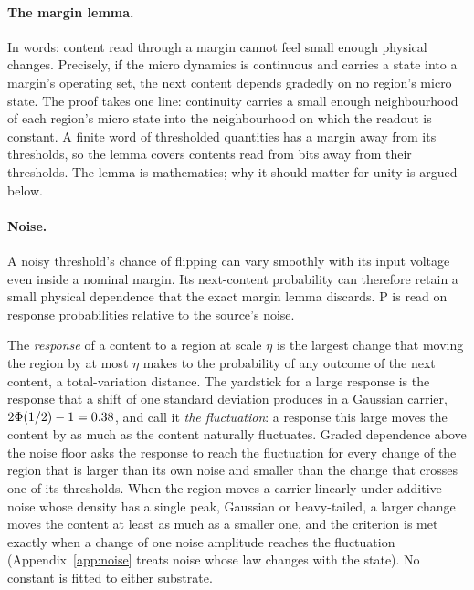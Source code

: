 \documentclass[12pt]{article}
\begin{document}
\paragraph{The margin lemma.} In words: content read through a margin cannot
feel small enough physical changes. Precisely, if the micro dynamics is
continuous and carries a state into a margin's operating set, the next content
depends gradedly on no region's micro state. The proof takes one line:
continuity carries a small enough neighbourhood of each region's micro state
into the neighbourhood on which the readout is constant. A finite word of
thresholded quantities has a margin away from its thresholds, so the lemma
covers contents read from bits away from their thresholds. The lemma is
mathematics; why it should matter for unity is argued below.

\paragraph{Noise.} A noisy threshold's chance of flipping can vary smoothly with
its input voltage even inside a nominal margin. Its next-content probability
can therefore retain a small physical dependence that the exact margin lemma
discards. P is read on response probabilities relative to the source's noise.

The \emph{response} of a content to a region at scale $\eta$ is the largest
change that moving the region by at most $\eta$ makes to the probability of any
outcome of the next content, a total-variation distance. The yardstick for a
large response is the response that a shift of one standard deviation produces
in a Gaussian carrier,
$2\Phi(1/2)-1=0.38$, and call it \emph{the fluctuation}: a response
this large moves the content by as much as the content naturally fluctuates.
Graded dependence above the noise floor asks the response to reach the
fluctuation for every change of the region that is larger than its own noise and
smaller than the change that crosses one of its thresholds. When the region
moves a carrier linearly under additive noise whose density has a single peak,
Gaussian or heavy-tailed, a larger change moves the content at least as much as
a smaller one, and the criterion is met exactly when a change of one noise
amplitude reaches the fluctuation (Appendix~\ref{app:noise} treats noise whose
law changes with the state). No constant is fitted to either substrate.
\end{document}
